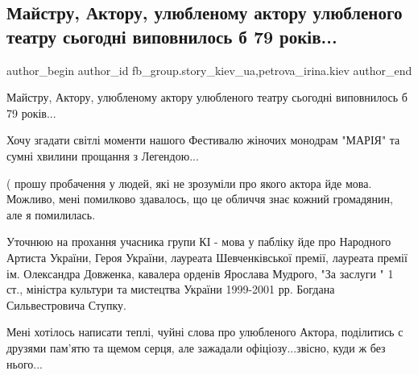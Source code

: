  
 
 
 
 
 
\subsection{Майстру, Актору, улюбленому актору улюбленого театру сьогодні виповнилось б 79  років...}
\label{sec:27_08_2020.fb.fb_group.story_kiev_ua.1.stupka}
 
\ifcmt
 author_begin
   author_id fb_group.story_kiev_ua,petrova_irina.kiev
 author_end
\fi

Майстру, Актору, улюбленому актору улюбленого театру сьогодні виповнилось б 79
років...

Хочу згадати світлі моменти нашого Фестивалю жіночих монодрам "МАРІЯ" та сумні
хвилини прощання з Легендою...

( прошу пробачення у людей, які не зрозуміли про якого актора йде мова.
Можливо, мені помилково здавалось, що це обличчя знає кожний громадянин, але я помилилась. 

\begin{multicols}{2}
\noindent
{}
\end{multicols}

Уточнюю на прохання учасника групи КІ - мова у пабліку йде про Народного
Артиста України, Героя України, лауреата Шевченківської премії, лауреата премії
ім. Олександра Довженка, кавалера орденів  Ярослава Мудрого, "За заслуги " 1
ст., міністра культури та  мистецтва  України 1999-2001 рр. Богдана
Сильвестровича Ступку. 

Мені хотілось написати теплі, чуйні слова про улюбленого Актора, поділитись с
друзями пам'ятю та щемом серця, але зажадали офіціозу...звісно, куди ж без
нього...

